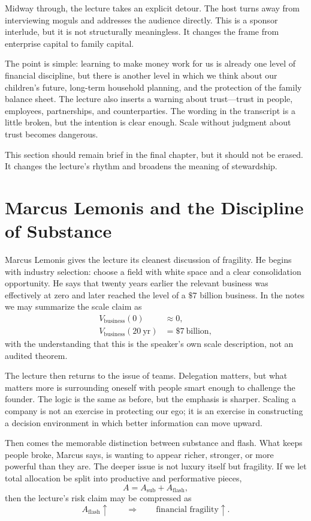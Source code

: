 Midway through, the lecture takes an explicit detour. The host turns away from interviewing moguls and addresses the audience directly. This is a sponsor interlude, but it is not structurally meaningless. It changes the frame from enterprise capital to family capital.

The point is simple: learning to make money work for us is already one level of financial discipline, but there is another level in which we think about our children's future, long-term household planning, and the protection of the family balance sheet. The lecture also inserts a warning about trust---trust in people, employees, partnerships, and counterparties. The wording in the transcript is a little broken, but the intention is clear enough. Scale without judgment about trust becomes dangerous.

This section should remain brief in the final chapter, but it should not be erased. It changes the lecture's rhythm and broadens the meaning of stewardship.

\section{Marcus Lemonis and the Discipline of Substance}

Marcus Lemonis gives the lecture its cleanest discussion of fragility. He begins with industry selection: choose a field with white space and a clear consolidation opportunity. He says that twenty years earlier the relevant business was effectively at zero and later reached the level of a \(\$7\) billion business. In the notes we may summarize the scale claim as
\begin{align}
V_{\text{business}}(0) &\approx 0,\\
V_{\text{business}}(20\ \text{yr}) &= \$7\ \text{billion},
\end{align}
with the understanding that this is the speaker's own scale description, not an audited theorem.

The lecture then returns to the issue of teams. Delegation matters, but what matters more is surrounding oneself with people smart enough to challenge the founder. The logic is the same as before, but the emphasis is sharper. Scaling a company is not an exercise in protecting our ego; it is an exercise in constructing a decision environment in which better information can move upward.

Then comes the memorable distinction between substance and flash. What keeps people broke, Marcus says, is wanting to appear richer, stronger, or more powerful than they are. The deeper issue is not luxury itself but fragility. If we let total allocation be split into productive and performative pieces,
\begin{equation}
A = A_{\text{sub}} + A_{\text{flash}},
\end{equation}
then the lecture's risk claim may be compressed as
\begin{equation}
A_{\text{flash}} \uparrow
\qquad \Longrightarrow \qquad
\text{financial fragility} \uparrow.
\end{equation}

